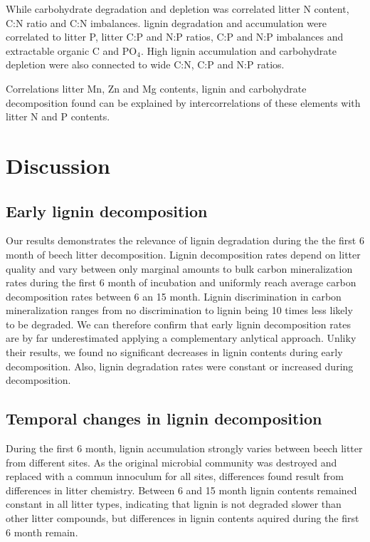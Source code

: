 \documentclass[authoryear,preprint,review,12pt]{elsarticle}
\begin{document}
While carbohydrate degradation and depletion was correlated litter N content, C:N ratio and C:N imbalances. lignin degradation and accumulation were correlated to litter P, litter C:P and N:P ratios, C:P and N:P imbalances and extractable organic C and PO$_4$. High lignin accumulation and carbohydrate depletion were also connected to wide C:N, C:P and N:P ratios.

Correlations litter Mn, Zn and Mg contents, lignin and carbohydrate decomposition found can be explained by intercorrelations of these elements with litter N and P contents.

\section{Discussion}
\subsection{Early lignin decomposition}
Our results demonstrates the relevance of lignin degradation during the the first 6 month of beech litter decomposition. Lignin decomposition rates depend on litter quality and vary between only marginal amounts to bulk carbon mineralization rates during the first 6 month of incubation and uniformly reach average carbon decomposition rates between 6 an 15 month. Lignin discrimination in carbon mineralization ranges from no discrimination to lignin being 10 times less likely to be degraded. We can therefore confirm that early lignin decomposition rates are by far underestimated \citep{Klotzbucher2011} applying a complementary anlytical approach. Unliky their results, we found no significant decreases in lignin contents during early decomposition. Also, lignin degradation rates were constant or increased during decomposition.


\subsection{Temporal changes in lignin decomposition}
During the first 6 month, lignin accumulation strongly varies between beech litter from different sites. As the original microbial community was destroyed and replaced with a commun innoculum for all sites, differences found result from differences in litter chemistry. Between 6 and 15 month lignin contents remained constant in all litter types, indicating that lignin is not degraded slower than other litter compounds, but differences in lignin contents aquired during the first 6 month remain.
\end{document}
